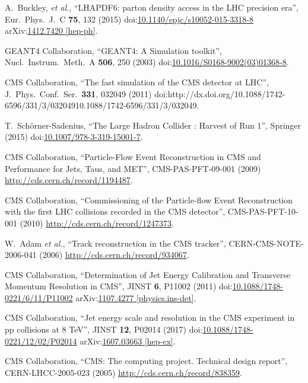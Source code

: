 \begin{thebibliography}{99}
A.~Buckley, {\it et al.}, ``LHAPDF6: parton density access in the LHC precision era'', Eur.\ Phys.\ J.\ C {\bf 75}, 132 (2015) doi:\href{http://dx.doi.org/10.1140/epjc/s10052-015-3318-8}{10.1140/epjc/s10052-015-3318-8} arXiv:\href{https://arxiv.org/abs/1412.7420}{1412.7420 [hep-ph]}.

GEANT4 Collaboration, ``GEANT4: A Simulation toolkit'', Nucl.\ Instrum.\ Meth.\ A {\bf 506}, 250 (2003) doi:\href{http://dx.doi.org/10.1016/S0168-9002(03)01368-8}{10.1016/S0168-9002(03)01368-8}.

CMS Collaboration, ``The fast simulation of the CMS detector at LHC'', J.\ Phys.\ Conf.\ Ser.\ {\bf 331}, 032049 (2011) doi:{http://dx.doi.org/10.1088/1742-6596/331/3/032049}{10.1088/1742-6596/331/3/032049}.

T.~Schörner-Sadenius, ``The Large Hadron Collider : Harvest of Run 1'', Springer (2015) doi:\href{http://dx.doi.org/10.1007/978-3-319-15001-7}{10.1007/978-3-319-15001-7}.

CMS Collaboration, ``Particle-Flow Event Reconstruction in CMS and Performance for Jets, Taus, and MET'', CMS-PAS-PFT-09-001 (2009) \url{http://cds.cern.ch/record/1194487}.

CMS Collaboration, ``Commissioning of the Particle-flow Event Reconstruction with the first LHC collisions recorded in the CMS detector'', CMS-PAS-PFT-10-001 (2010) \url{http://cds.cern.ch/record/1247373}.

W.~Adam {\it et al.}, ``Track reconstruction in the CMS tracker'', CERN-CMS-NOTE-2006-041 (2006) \url{http://cds.cern.ch/record/934067}.

CMS Collaboration, ``Determination of Jet Energy Calibration and Transverse Momentum Resolution in CMS'', JINST {\bf 6}, P11002 (2011) doi:\href{http://dx.doi.org/10.1088/1748-0221/6/11/P11002}{10.1088/1748-0221/6/11/P11002} arXiv:\href{http://arxiv.org/abs/arXiv:1107.4277}{1107.4277 [physics.ins-det]}.

CMS Collaboration, ``Jet energy scale and resolution in the CMS experiment in pp collisions at 8 TeV'', JINST {\bf 12}, P02014 (2017) doi:\href{http://dx.doi.org/10.1088/1748-0221/12/02/P02014}{10.1088/1748-0221/12/02/P02014} arXiv:\href{https://arxiv.org/abs/1607.03663}{1607.03663 [hep-ex]}.

CMS Collaboration, ``CMS: The computing project. Technical design report'', CERN-LHCC-2005-023 (2005) \url{http://cds.cern.ch/record/838359}.


\end{thebibliography}
